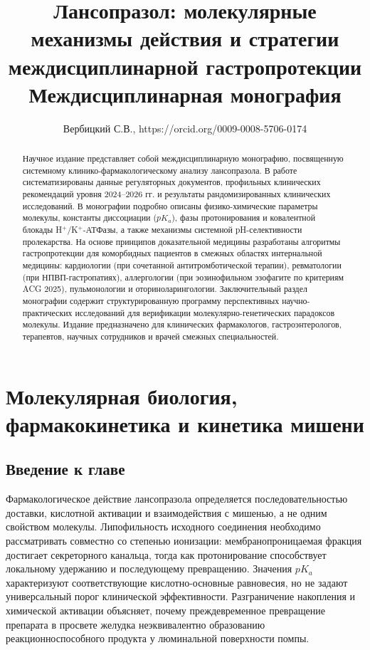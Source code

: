 \documentclass[11pt,a4paper,notitlepage]{report}
\title{\textbf{Лансопразол: молекулярные механизмы действия и стратегии междисциплинарной гастропротекции}\\[0.4em]\large Междисциплинарная монография\\}
\author{Вербицкий С.В., https://orcid.org/0009-0008-5706-0174}
\date{}
\newcommand{\src}[1]{\unskip\space\cite{#1}}
\begin{document}
\maketitle

\begin{abstract}
Научное издание представляет собой междисциплинарную монографию, посвященную системному клинико-фармакологическому анализу лансопразола. В работе систематизированы данные регуляторных документов, профильных клинических рекомендаций уровня 2024--2026 гг. и результаты рандомизированных клинических исследований. В монографии подробно описаны физико-химические параметры молекулы, константы диссоциации ($pK_a$), фазы протонирования и ковалентной блокады H$^+$/K$^+$-АТФазы, а также механизмы системной pH-селективности пролекарства. На основе принципов доказательной медицины разработаны алгоритмы гастропротекции для коморбидных пациентов в смежных областях интернальной медицины: кардиологии (при сочетанной антитромботической терапии), ревматологии (при НПВП-гастропатиях), аллергологии (при эозинофильном эзофагите по критериям ACG 2025), пульмонологии и оториноларингологии. Заключительный раздел монографии содержит структурированную программу перспективных научно-практических исследований для верификации молекулярно-генетических парадоксов молекулы. Издание предназначено для клинических фармакологов, гастроэнтерологов, терапевтов, научных сотрудников и врачей смежных специальностей.
\end{abstract}

\clearpage
\tableofcontents
\clearpage
{}

\chapter{Молекулярная биология, фармакокинетика и кинетика мишени}
\label{chap:molecular}

\section*{Введение к главе}
Фармакологическое действие лансопразола определяется последовательностью доставки, кислотной активации и взаимодействия с мишенью, а не одним свойством молекулы. Липофильность исходного соединения необходимо рассматривать совместно со степенью ионизации: мембранопроницаемая фракция достигает секреторного канальца, тогда как протонирование способствует локальному удержанию и последующему превращению. Значения $pK_a$ характеризуют соответствующие кислотно-основные равновесия, но не задают универсальный порог клинической эффективности. Разграничение накопления и химической активации объясняет, почему преждевременное превращение препарата в просвете желудка неэквивалентно образованию реакционноспособного продукта у люминальной поверхности помпы.\src{molchem,molnagaya90,pharmalabel}
\end{document}
